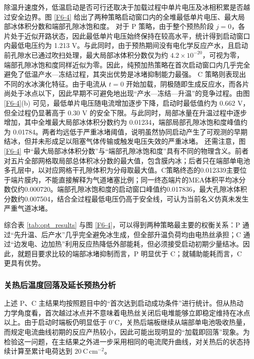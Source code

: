 \documentclass[bwprint]{gmcmthesis}
\numberwithin{equation}{section}
\numberwithin{figure}{section}
\begin{document}
\begin{samepage}
除温升速度外，低温启动是否可行还取决于加载过程中单片电压及冰相积累是否越过安全边界。图 \ref{F6-4} 给出了两种策略启动窗口内的全堆最低单片电压、最大局部冰体积分数和端部孔隙冰饱和度。
对于 P 策略，由于整个预热阶段 \(j=0\)，各片处于近似开路状态，因此最低单片电压始终保持在较高水平，统计得到启动窗口内最低电压约为 1.213 V。与此同时，由于预热期间没有电化学反应产水，且启动前孔隙水已通过吹扫处理，最大局部冰体积分数仅为约 \(4.2\times10^{-20}\)，可视为零，端部孔隙冰饱和度同样近似为零。因此，纯预加热策略在首次启动窗口内几乎完全避免了低温产水—冻结过程，其突出优势是冰堵抑制能力最强。 
C 策略则表现出不同的水冰演化特征。由于电流从 \(t=0\) 开始加载，阴极随即生成反应水，而各片尚处于冰点以下，因此早期不可避免地出现“产水—冻结—升温”的竞争过程。由图 \ref{F6-4}(b) 可见，最低单片电压随电流增加逐步下降，启动时最低值约为 0.662 V，但全过程仍显著高于 0.30 V 的安全下限。与此同时，局部冰量在升温过程中逐步增加，其中全堆最大局部冰体积分数约为 0.01234，端部局部孔隙冰饱和度峰值约为 0.01784。两者均远低于严重冰堵阈值，说明虽然协同启动产生了可观测的早期结冰，但并未形成足以阻塞气体传输或触发电压失效的严重冰堵。   
还需注意，图 \ref{F6-4} 中“最大局部冰体积分数”与“端部孔隙冰饱和度”具有不同的物理含义。前者对五片全部网格取局部总体积冰分数的最大值，包含膜内冰；后者只在端部单电池多孔层中，以对应网格干孔隙体积为分母取最大值。C策略终态的0.012339主要位于端片膜内，不能直接解释为气道堵塞比例；同一终态端片的MEA体积平均冰分数仅约0.000720。端部孔隙冰饱和度的启动窗口峰值约0.017836，最大孔隙冰体积分数约0.007504，结合全过程最低电压仍高于安全线，可认为当前名义仿真未发生严重气道冰堵。   \par
\end{samepage}

综合表 \ref{tab:opt_results} 与图 \ref{F6-4}，可以得到两种策略最主要的权衡关系：P 通过“先升温、后产水”几乎完全避免冰生成，但全部升温负荷均由电热丝承担；C 通过“边发电、边加热”利用反应热降低外部能耗，但必须接受启动初期少量结冰。因此，就题目要求比较的端部冰堵抑制而言，P 明显优于 C；就辅助能耗而言，C 更具有优势。

\subsubsection{关热后温度回落及延长预热分析}
上述 P、C 主结果均按照题目中的“首次达到启动成功条件”进行统计。但从热动力学角度看，首次越过冰点并不意味着电热丝关闭后电堆能够立即稳定维持在冰点以上。由于启动时端板仍明显低于 \(0^\circ\mathrm C\)，关热后端板继续从端部单电池吸收热量，而规定电流曲线初期的反应产热较小，因此可能出现明显的“加载即回落”现象。为检验这一问题，在主结果之外进一步采用相同的电流爬升曲线，对关热后的状态持续计算至累计电荷达到 \(20\ \mathrm{C\,cm^{-2}}\)。
\end{document}
